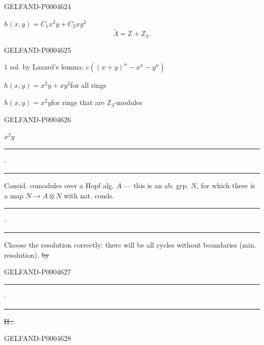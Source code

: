 \begin{GelfandAdjacentEvidence}{GELFAND-P000462}{4}


\quad $h(x,y)=C_1x^2y+C_2xy^2$
\[
\widetilde\Lambda=\mathbb Z+\mathbb Z_3.
\]
\end{GelfandAdjacentEvidence}
\begin{GelfandAdjacentEvidence}{GELFAND-P000462}{5}


$1$ sol. by Lazard’s lemma: $c((x+y)^n-x^n-y^n)$

$h(x,y)=x^2y+xy^2$\qquad for all rings

$h(x,y)=x^2y$\qquad for rings that are $\mathbb Z_3$-modules
\end{GelfandAdjacentEvidence}
\begin{GelfandAdjacentEvidence}{GELFAND-P000462}{6}


\noindent\hspace*{1.7em}$x^2y$

\begin{center}
\rule[.5ex]{26mm}{.35pt}\enspace$\cdot$\enspace\rule[.5ex]{27mm}{.35pt}
\end{center}
Consid. comodules over a Hopf alg. $A$ — this is an ab. grp. $N$, for which there is a map $N\longrightarrow A\otimes N$ with nat. conds.
\begin{center}
\rule[.5ex]{25mm}{.35pt}\enspace$\cdot$\enspace\rule[.5ex]{29mm}{.35pt}
\end{center}

Choose the resolution correctly: there will be all cycles without boundaries (min. resolution). \sout{by}
\end{GelfandAdjacentEvidence}
\begin{GelfandAdjacentEvidence}{GELFAND-P000462}{7}

\begin{center}
\rule[.5ex]{26mm}{.35pt}\enspace$\cdot$\enspace\rule[.5ex]{29mm}{.35pt}
\end{center}

\sout{Н\ldots}
\end{GelfandAdjacentEvidence}
\begin{GelfandAdjacentEvidence}{GELFAND-P000462}{8}

\end{GelfandAdjacentEvidence}
